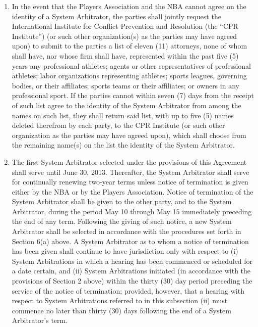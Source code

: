 \documentclass[
]{book}
\providecommand{\tightlist}{%
  \setlength{\itemsep}{0pt}\setlength{\parskip}{0pt}}
\begin{document}
\begin{enumerate}
\def\labelenumi{(\alph{enumi})}
\tightlist
\item
  In the event that the Players Association and the NBA cannot agree on the identity of a System Arbitrator, the parties shall jointly request the International Institute for Conflict Prevention and Resolution (the ``CPR Institute'') (or such other organization(s) as the parties may have agreed upon) to submit to the parties a list of eleven (11) attorneys, none of whom shall have, nor whose firm shall have, represented within the past five (5) years any professional athletes; agents or other representatives of professional athletes; labor organizations representing athletes; sports leagues, governing bodies, or their affiliates; sports teams or their affiliates; or owners in any professional sport. If the parties cannot within seven (7) days from the receipt of such list agree to the identity of the System Arbitrator from among the names on such list, they shall return said list, with up to five (5) names deleted therefrom by each party, to the CPR Institute (or such other organization as the parties may have agreed upon), which shall choose from the remaining name(s) on the list the identity of the System Arbitrator.
\item
  The first System Arbitrator selected under the provisions of this Agreement shall serve until June 30, 2013. Thereafter, the System Arbitrator shall serve for continually renewing two-year terms unless notice of termination is given either by the NBA or by the Players Association. Notice of termination of the System Arbitrator shall be given to the other party, and to the System Arbitrator, during the period May 10 through May 15 immediately preceding the end of any term. Following the giving of such notice, a new System Arbitrator shall be selected in accordance with the procedures set forth in Section 6(a) above. A System Arbitrator as to whom a notice of termination has been given shall continue to have jurisdiction only with respect to (i) System Arbitrations in which a hearing has been commenced or scheduled for a date certain, and (ii) System Arbitrations initiated (in accordance with the provisions of Section 2 above) within the thirty (30) day period preceding the service of the notice of termination; provided, however, that a hearing with respect to System Arbitrations referred to in this subsection (ii) must commence no later than thirty (30) days following the end of a System Arbitrator's term.
\end{enumerate}
\end{document}

